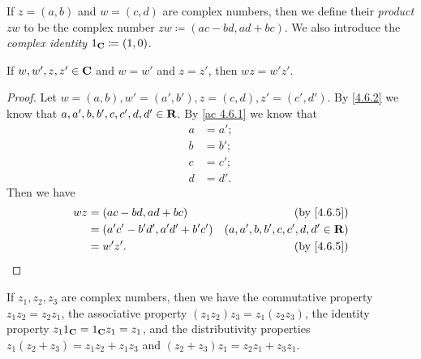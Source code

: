 \begin{definition}\label{4.6.5}
  If \(z = (a, b)\) and \(w = (c, d)\) are complex numbers, then we define their \emph{product} \(zw\) to be the complex number \(zw \coloneqq (ac - bd, ad + bc)\).
  We also introduce the \emph{complex identity} \(1_{\mathbf{C}} \coloneqq (1, 0)\).
\end{definition}

\begin{additional corollary}\label{ac 4.6.3}
If \(w, w', z, z' \in \mathbf{C}\) and \(w = w'\) and \(z = z'\), then \(wz = w'z'\).
\end{additional corollary}

\begin{proof}
  Let \(w = (a, b), w' = (a', b'), z = (c, d), z' = (c', d')\).
  By \cref{4.6.2} we know that \(a, a', b, b', c, c', d, d' \in \mathbf{R}\).
  By \cref{ac 4.6.1} we know that
  \begin{align*}
    a & = a'; \\
    b & = b'; \\
    c & = c'; \\
    d & = d'.
  \end{align*}
  Then we have
  \begin{align*}
    wz & = (ac - bd, ad + bc)             & \text{(by \cref{4.6.5})}            \\
       & = (a' c' - b' d', a' d' + b' c') & (a, a', b, b', c, c', d, d' \in \R) \\
       & = w' z'.                         & \text{(by \cref{4.6.5})}
  \end{align*}
\end{proof}

\begin{lemma}\label{4.6.6}
  If \(z_1, z_2, z_3\) are complex numbers, then we have the commutative property \(z_1 z_2 = z_2 z_1\), the associative property \((z_1 z_2) z_3 = z_1 (z_2 z_3)\), the identity property \(z_1 1_{\mathbf{C}} = 1_{\mathbf{C}} z_1 = z_1\), and the distributivity properties \(z_1 (z_2 + z_3) = z_1 z_2 + z_1 z_3\) and \((z_2 + z_3) z_1 = z_2 z_1 + z_3 z_1\).
\end{lemma}

